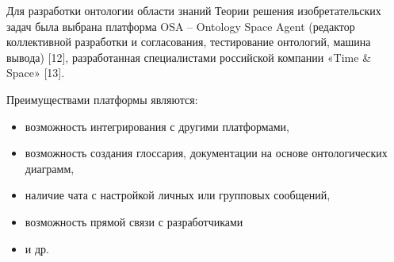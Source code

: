 \documentclass[11pt,a4paper]{article}
\begin{document}
Для разработки онтологии области знаний Теории решения изобретательских задач
была выбрана платформа OSA – Ontology Space Agent (редактор коллективной
разработки и согласования, тестирование онтологий, машина вывода) [12],
разработанная специалистами российской компании «Time \& Space» [13].

Преимуществами платформы являются:
\begin{itemize}[noitemsep]
\item возможность интегрирования с другими платформами,
\item возможность создания глоссария, документации на основе онтологических
  диаграмм,
\item наличие чата с настройкой личных или групповых сообщений,
\item возможность прямой связи с разработчиками
\item и др.
\end{itemize}
\end{document}
